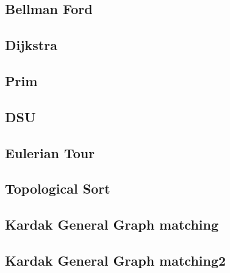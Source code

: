 \documentclass[a4paper,landscape]{article}
\begin{document}
\begin{multicols}{2}
\subsection{Bellman Ford}
	
\subsection{Dijkstra}
	
\subsection{Prim}
	
\subsection{DSU}
	
\subsection{Eulerian Tour}
	
\subsection{Topological Sort}
	
\subsection{Kardak General Graph matching}
	
\subsection{Kardak General Graph matching2}
	

\end{multicols}
\end{document}
